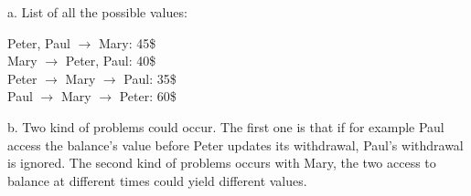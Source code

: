 \documentclass[a4paper,12pt]{article}
\begin{document}
a.  List of all the possible values:

\noindent
Peter, Paul $\rightarrow$ Mary: 45\$\\
Mary $\rightarrow$ Peter, Paul: 40\$\\
Peter $\rightarrow$ Mary $\rightarrow$ Paul: 35\$\\
Paul $\rightarrow$ Mary $\rightarrow$ Peter: 60\$

b.  Two kind of problems could occur.  The first one is that if for
example Paul access the balance's value before Peter updates its
withdrawal, Paul's withdrawal is ignored.  The second kind of problems
occurs with Mary,  the two access to balance at different times could
yield different values.
\end{document}
